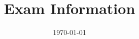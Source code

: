 


% 





\newif\ifsectiona

\newif\ifquant
\quanttrue

\ifsectiona%
    \newcommand{\sectionaonly}[1]{#1}%
\else%
    \newcommand{\sectionaonly}[1]{}%
\fi

\ifquant%
    \newcommand{\quantonly}[1]{#1}%
\else%
    \newcommand{\quantonly}[1]{}%
\fi

\title[Exam Information]{Exam Information}
\date{\today}



